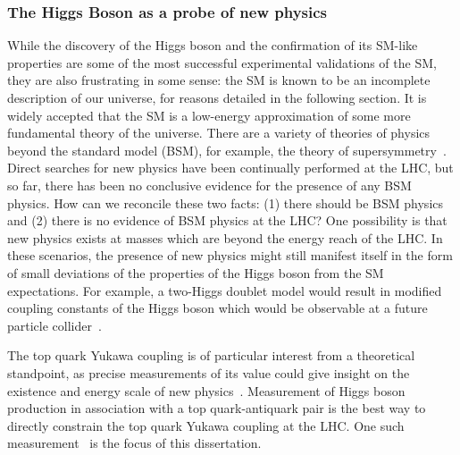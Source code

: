 \subsubsection{The Higgs Boson as a probe of new physics}
While the discovery of the Higgs boson and the confirmation of its SM-like properties are some of the most successful experimental validations of the SM, they are also frustrating in some sense:
the SM is known to be an incomplete description of our universe, for reasons detailed in the following section.
It is widely accepted that the SM is a low-energy approximation of some more fundamental theory of the universe.
There are a variety of theories of physics beyond the standard model (BSM), for example, the theory of supersymmetry~\cite{Martin:1997ns}.
Direct searches for new physics have been continually performed at the LHC, but so far, there has been no conclusive evidence for the presence of any BSM physics.
How can we reconcile these two facts: (1) there should be BSM physics and (2) there is no evidence of BSM physics at the LHC?
One possibility is that new physics exists at masses which are beyond the energy reach of the LHC.
In these scenarios, the presence of new physics might still manifest itself in the form of small deviations of the properties of the Higgs boson from the SM expectations.
For example, a two-Higgs doublet model would result in modified coupling constants of the Higgs boson which would be observable at a future particle collider~\cite{Kanemura:2004mg}.

The top quark Yukawa coupling is of particular interest from a theoretical standpoint, as precise measurements of its value could give insight on the existence and energy scale of new physics~\cite{why_care_top_yukawa}.
Measurement of Higgs boson production in association with a top quark-antiquark pair is the best way to directly constrain the top quark Yukawa coupling at the LHC.
One such measurement~\cite{tth_observation} is the focus of this dissertation.

